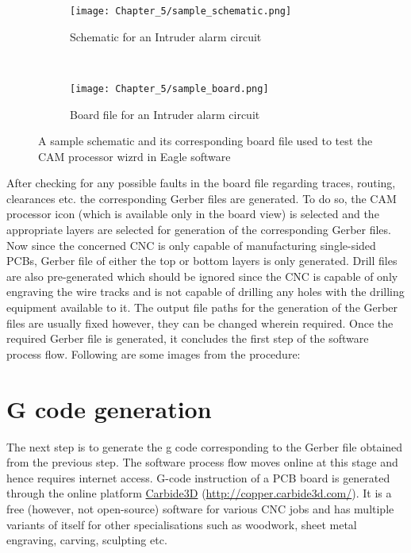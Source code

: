 \begin{figure}[h]
\begin{center}
\hspace{-45mm}
 \begin{subfigure}{0.5\textwidth}
  \texttt{[image: Chapter\_5/sample\_schematic.png]}
  \caption{Schematic for an Intruder alarm circuit} 
  \label{fig:ckt_sch}
 \end{subfigure} \\
 \end{center}
 \begin{center}
 \begin{subfigure}{0.5\textwidth}
  \texttt{[image: Chapter\_5/sample\_board.png]}
  \caption{Board file for an Intruder alarm circuit}
  \label{fig:ckt_brd}
 \end{subfigure} 
\end{center}

 \caption{A sample schematic and its corresponding board file used to test the CAM processor wizrd in Eagle software}
 \label{fig:sample_ckt}
\end{figure}


After checking for any possible faults in the board file regarding traces, routing, clearances etc. the corresponding Gerber files are generated. To do so, the CAM processor icon (which is available only in the board view) is selected and the appropriate layers are selected for generation of the corresponding Gerber files. Now since the concerned CNC is only capable of manufacturing single-sided PCBs, Gerber file of either the top or bottom layers is only generated. Drill files are also pre-generated which should be ignored since the CNC is capable of only engraving the wire tracks and is not capable of drilling any holes with the drilling equipment available to it. The output file paths for the generation of the Gerber files are usually fixed however, they can be changed wherein required. Once the required Gerber file is generated, it concludes the first step of the software process flow. Following are some images from the procedure: \par



\section{G code generation}

The next step is to generate the g code corresponding to the Gerber file obtained from the previous step. The software process flow moves online at this stage and hence requires internet access. G-code instruction of a PCB board is generated through the online platform \href{http://copper.carbide3d.com/}{Carbide3D} (\url{http://copper.carbide3d.com/}). It is a free (however, not open-source) software for various CNC jobs and has multiple variants of itself for other specialisations such as woodwork, sheet metal engraving, carving, sculpting etc. \par

